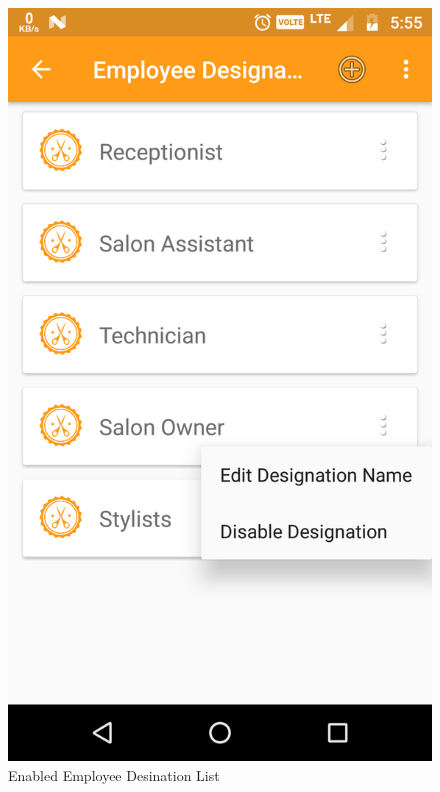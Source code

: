 \\
\begin{figure}[h]
	\centering
	\includegraphics[width=0.7\linewidth]{EnabledEmployeeDesinationList}
	\caption{Enabled Employee Desination List}
\end{figure}
\pagebreak

